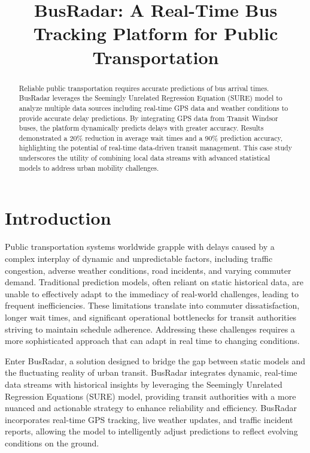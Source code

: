 \documentclass[conference]{IEEEtran}
\begin{document}
\title{BusRadar: A Real-Time Bus Tracking Platform for Public Transportation}

\maketitle

\begin{abstract}
Reliable public transportation requires accurate predictions of bus arrival times. BusRadar leverages the Seemingly Unrelated Regression Equation (SURE) model to analyze multiple data sources including real-time GPS data and weather conditions to provide accurate delay predictions. By integrating GPS data from Transit Windsor buses, the platform dynamically predicts delays with greater accuracy. Results demonstrated a 20\% reduction in average wait times and a 90\% prediction accuracy, highlighting the potential of real-time data-driven transit management. This case study underscores the utility of combining local data streams with advanced statistical models to address urban mobility challenges. 
\end{abstract}

\section{Introduction}
Public transportation systems worldwide grapple with delays caused by a complex interplay of dynamic and unpredictable factors, including traffic congestion, adverse weather conditions, road incidents, and varying commuter demand. Traditional prediction models, often reliant on static historical data, are unable to effectively adapt to the immediacy of real-world challenges, leading to frequent inefficiencies. These limitations translate into commuter dissatisfaction, longer wait times, and significant operational bottlenecks for transit authorities striving to maintain schedule adherence. Addressing these challenges requires a more sophisticated approach that can adapt in real time to changing conditions.

Enter BusRadar, a solution designed to bridge the gap between static models and the fluctuating reality of urban transit. BusRadar integrates dynamic, real-time data streams with historical insights by leveraging the Seemingly Unrelated Regression Equations (SURE) model, providing transit authorities with a more nuanced and actionable strategy to enhance reliability and efficiency. BusRadar incorporates real-time GPS tracking, live weather updates, and traffic incident reports, allowing the model to intelligently adjust predictions to reflect evolving conditions on the ground.
\end{document}
